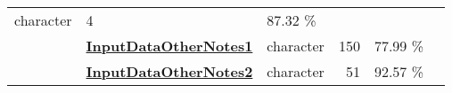\documentclass[]{article}
\begin{document}
\begin{longtable}[]{@{}lllrcl@{}}
\begin{minipage}[t]{0.11\columnwidth}
character\strut
\end{minipage} & \begin{minipage}[t]{0.10\columnwidth}\raggedleft\strut
4\strut
\end{minipage} & \begin{minipage}[t]{0.10\columnwidth}\centering\strut
87.32 \%\strut
\end{minipage} & \begin{minipage}[t]{0.12\columnwidth}\raggedright\strut
\strut
\end{minipage}\tabularnewline
\begin{minipage}[t]{0.07\columnwidth}\raggedright\strut
\strut
\end{minipage} & \begin{minipage}[t]{0.35\columnwidth}\raggedright\strut
\textbf{\protect\hyperlink{inputdataothernotes1}{InputDataOtherNotes1}}\strut
\end{minipage} & \begin{minipage}[t]{0.11\columnwidth}\raggedright\strut
character\strut
\end{minipage} & \begin{minipage}[t]{0.10\columnwidth}\raggedleft\strut
150\strut
\end{minipage} & \begin{minipage}[t]{0.10\columnwidth}\centering\strut
77.99 \%\strut
\end{minipage} & \begin{minipage}[t]{0.12\columnwidth}\raggedright\strut
\strut
\end{minipage}\tabularnewline
\begin{minipage}[t]{0.07\columnwidth}\raggedright\strut
\strut
\end{minipage} & \begin{minipage}[t]{0.35\columnwidth}\raggedright\strut
\textbf{\protect\hyperlink{inputdataothernotes2}{InputDataOtherNotes2}}\strut
\end{minipage} & \begin{minipage}[t]{0.11\columnwidth}\raggedright\strut
character\strut
\end{minipage} & \begin{minipage}[t]{0.10\columnwidth}\raggedleft\strut
51\strut
\end{minipage} & \begin{minipage}[t]{0.10\columnwidth}\centering\strut
92.57 \%\strut
\end{minipage} & \begin{minipage}[t]{0.12\columnwidth}\raggedright\strut

\end{minipage}
\end{longtable}
\end{document}
